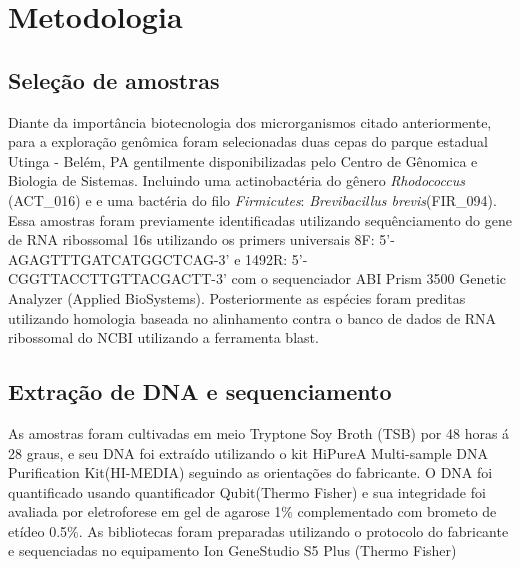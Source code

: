 \chapter{Metodologia}
\section{Seleção de amostras}

Diante da importância biotecnologia dos microrganismos citado anteriormente, 
para a exploração genômica foram selecionadas duas cepas do parque estadual Utinga - Belém, PA gentilmente disponibilizadas pelo Centro de Gênomica e Biologia de Sistemas.
Incluindo uma actinobactéria do gênero \textit{Rhodococcus} (ACT\_016) e e uma bactéria do filo \textit{Firmicutes}: \textit{Brevibacillus brevis}(FIR\_094).
Essa amostras foram previamente identificadas utilizando sequênciamento do gene de RNA ribossomal 16s
utilizando os primers universais 8F: 5'-AGAGTTTGATCATGGCTCAG-3' e 1492R: 5'-CGGTTACCTTGTTACGACTT-3' com o sequenciador 
ABI Prism 3500 Genetic Analyzer (Applied BioSystems). Posteriormente as espécies foram preditas utilizando
homologia baseada no alinhamento contra o banco de dados de RNA ribossomal do NCBI utilizando a ferramenta
blast.

\section{Extração de DNA e sequenciamento}
As amostras foram cultivadas em meio Tryptone Soy Broth (TSB) por 48 horas á 28 graus, e
seu DNA foi extraído utilizando o kit HiPureA Multi-sample DNA Purification Kit(HI-MEDIA) seguindo as orientações
do fabricante. O DNA foi quantificado usando quantificador Qubit(Thermo Fisher) e sua integridade foi 
avaliada por eletroforese em gel de agarose 1\% complementado com brometo de etídeo 0.5\%.
As bibliotecas foram preparadas utilizando o protocolo do fabricante e sequenciadas no equipamento
Ion GeneStudio S5 Plus (Thermo Fisher)

